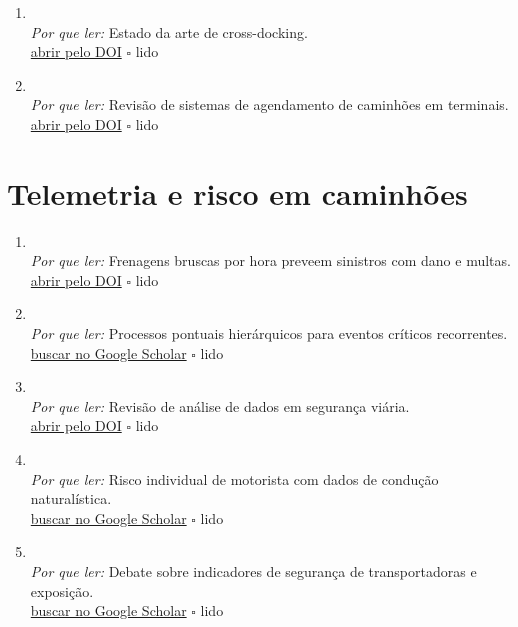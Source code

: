 \begin{enumerate}[leftmargin=*]
  \item {}\\
  \textit{Por que ler:} Estado da arte de cross-docking.\\
  \href{https://doi.org/10.1016/j.omega.2012.01.005}{abrir pelo DOI} \hfill $\square$ \textsf{\small lido}
  \item {}\\
  \textit{Por que ler:} Revisão de sistemas de agendamento de caminhões em terminais.\\
  \href{https://doi.org/10.3141/2548-01}{abrir pelo DOI} \hfill $\square$ \textsf{\small lido}
\end{enumerate}

\section{Telemetria e risco em caminhões}
\begin{enumerate}[leftmargin=*]
  \item {}\\
  \textit{Por que ler:} Frenagens bruscas por hora preveem sinistros com dano e multas.\\
  \href{https://doi.org/10.1177/03611981231211897}{abrir pelo DOI} \hfill $\square$ \textsf{\small lido}
  \item {}\\
  \textit{Por que ler:} Processos pontuais hierárquicos para eventos críticos recorrentes.\\
  \href{https://scholar.google.com/scholar?q=Hierarchical+point+process+models+for+recurring+safety+critical+events+involving+commercial+truck+drivers\%3A+a+reliability+framework+for+human+performance+modeling}{buscar no Google Scholar} \hfill $\square$ \textsf{\small lido}
  \item {}\\
  \textit{Por que ler:} Revisão de análise de dados em segurança viária.\\
  \href{https://doi.org/10.3390/s20041107}{abrir pelo DOI} \hfill $\square$ \textsf{\small lido}
  \item {}\\
  \textit{Por que ler:} Risco individual de motorista com dados de condução naturalística.\\
  \href{https://scholar.google.com/scholar?q=Individual+driver+risk+assessment+using+naturalistic+driving+data}{buscar no Google Scholar} \hfill $\square$ \textsf{\small lido}
  \item {}\\
  \textit{Por que ler:} Debate sobre indicadores de segurança de transportadoras e exposição.\\
  \href{https://scholar.google.com/scholar?q=Improving+Motor+Carrier+Safety+Measurement}{buscar no Google Scholar} \hfill $\square$ \textsf{\small lido}
\end{enumerate}

